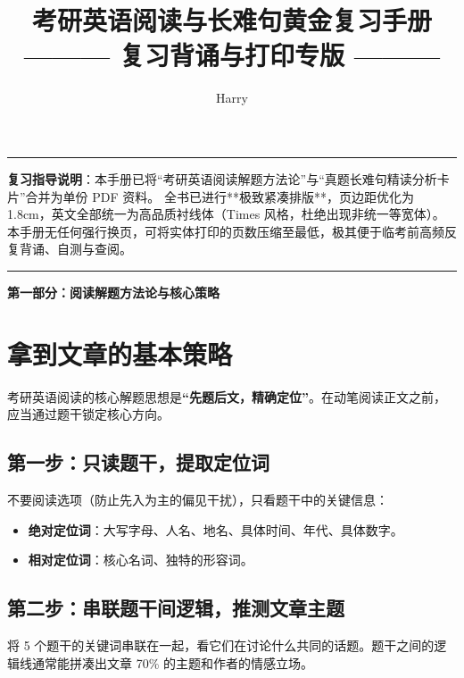 \documentclass[cn,normal,11pt]{elegantnote}
\title{考研英语阅读与长难句黄金复习手册\\{\large ——— 复习背诵与打印专版 ———}}
\author{Harry}
\date{}
\newcommand{\retrokey}[1]{{\color{accentcolor}\textbf{#1}}}
\begin{document}
\linespread{1.15}\selectfont
\setlength{\parskip}{1.5pt}

\maketitle

\vspace{-10pt}
\hrule
\vspace{10pt}

\noindent \textbf{复习指导说明}：本手册已将“考研英语阅读解题方法论”与“真题长难句精读分析卡片”合并为单份 PDF 资料。
全书已进行**极致紧凑排版**，页边距优化为 1.8cm，英文全部统一为高品质衬线体（Times 风格，杜绝出现非统一等宽体）。本手册无任何强行换页，可将实体打印的页数压缩至最低，极其便于临考前高频反复背诵、自测与查阅。

\vspace{5pt}
\hrule
\vspace{10pt}

\begin{center}
  {\color{ecolor} \LARGE\bfseries 第一部分：阅读解题方法论与核心策略}
\end{center}
\vspace{5pt}

\section{拿到文章的基本策略}
考研英语阅读的核心解题思想是\retrokey{“先题后文，精确定位”}。在动笔阅读正文之前，应当通过题干锁定核心方向。

\subsection{第一步：只读题干，提取定位词}
不要阅读选项（防止先入为主的偏见干扰），只看题干中的关键信息：
\begin{itemize}
  \item \textbf{绝对定位词}：大写字母、人名、地名、具体时间、年代、具体数字。
  \item \textbf{相对定位词}：核心名词、独特的形容词。
\end{itemize}

\subsection{第二步：串联题干间逻辑，推测文章主题}
将 5 个题干的关键词串联在一起，看它们在讨论什么共同的话题。题干之间的逻辑线通常能拼凑出文章 70\% 的主题和作者的情感立场。
\end{document}
